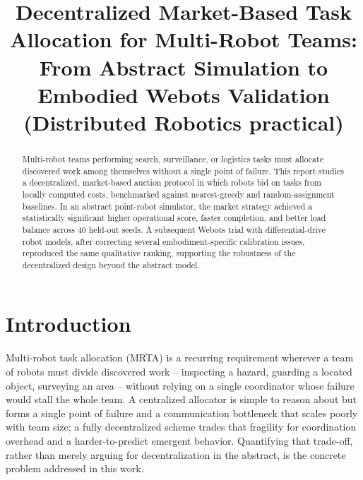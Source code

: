 \documentclass[conference]{IEEEtran}
\begin{document}
\title{Decentralized Market-Based Task Allocation for Multi-Robot Teams: From Abstract Simulation to Embodied Webots Validation (Distributed Robotics practical)}

\author{
}

\maketitle
\let\thefootnote\relax{}

\begin{abstract}
Multi-robot teams performing search, surveillance, or logistics tasks must
allocate discovered work among themselves without a single point of
failure. This report studies a decentralized, market-based auction
protocol in which robots bid on tasks from locally computed costs,
benchmarked against nearest-greedy and random-assignment baselines. In an
abstract point-robot simulator, the market strategy achieved a
statistically significant higher operational score, faster completion,
and better load balance across 40 held-out seeds. A subsequent Webots
trial with differential-drive robot models, after correcting several
embodiment-specific calibration issues, reproduced the same qualitative
ranking, supporting the robustness of the decentralized design beyond the
abstract model.
\end{abstract}

\section{Introduction}

Multi-robot task allocation (MRTA) is a recurring requirement wherever a
team of robots must divide discovered work -- inspecting a hazard, guarding
a located object, surveying an area -- without relying on a single
coordinator whose failure would stall the whole team. A centralized
allocator is simple to reason about but forms a single point of failure
and a communication bottleneck that scales poorly with team size; a fully
decentralized scheme trades that fragility for coordination overhead and
a harder-to-predict emergent behavior. Quantifying that trade-off, rather
than merely arguing for decentralization in the abstract, is the concrete
problem addressed in this work.
\end{document}
